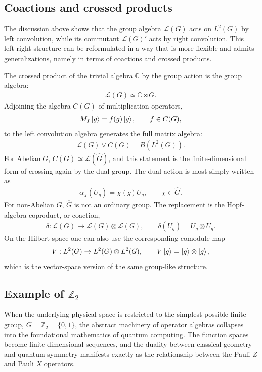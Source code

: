 \documentclass[11pt]{article}
\begin{document}
\subsection{Coactions and crossed products}

The discussion above shows that the group algebra $\mathcal L(G)$ acts on
$L^2(G)$ by left convolution, while its commutant $\mathcal L(G)'$ acts by right
convolution. This left-right structure can be reformulated in a way that is more
flexible and admits generalizations, namely in terms of coactions and crossed
products.

The crossed product of the trivial algebra $\mathbb C$ by the group action is
the group algebra:
\begin{align}
    \mathcal{L}(G)\simeq \mathbb{C}\rtimes G.
\end{align}
Adjoining the algebra $C(G)$ of multiplication operators,
\begin{align}
    M_f\ket g=f(g)\ket g,\qquad f\in C(G),
\end{align}
to the left convolution algebra generates the full matrix algebra:
\begin{align}
    \mathcal L(G)\vee C(G)=B(L^2(G)).
\end{align}
For Abelian $G$, $C(G)\simeq\mathcal L(\hat G)$, and this statement is the
finite-dimensional form of crossing again by the dual group. The dual action is
most simply written as
\begin{align}
    \alpha_\chi(U_g)=\chi(g)U_g,
    \qquad \chi\in\hat G .
\end{align}
For non-Abelian $G$, $\hat G$ is not an ordinary group. The replacement is the
Hopf-algebra coproduct, or coaction,
\begin{align}
    \delta:\mathcal L(G)\to\mathcal L(G)\otimes\mathcal L(G),
    \qquad
    \delta(U_g)=U_g\otimes U_g.
\end{align}
On the Hilbert space one can also use the corresponding comodule map
\begin{align}
    V:L^2(G)\to L^2(G)\otimes L^2(G),
    \qquad
    V\ket g=\ket g\otimes\ket g,
\end{align}
which is the vector-space version of the same group-like structure.

\subsection[Example of Z2]{Example of $\mathbb{Z}_2$}

When the underlying physical space is restricted to the simplest possible finite group, $G = \mathbb{Z}_2 = \{0, 1\}$, the abstract machinery of operator algebras collapses into the foundational mathematics of quantum computing. The function spaces become finite-dimensional sequences, and the duality between classical geometry and quantum symmetry manifests exactly as the relationship between the Pauli $Z$ and Pauli $X$ operators.
\end{document}
